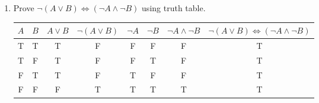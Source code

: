 \documentclass{article}[12pt]
\begin{document}
\begin{enumerate}
\begin{table}[H]
\begin{tabular}{c|c|||c||c||c|c||c|||c}
\end{tabular}
\end{table}
\item Prove $\neg (A\vee B) \Longleftrightarrow (\neg A \wedge \neg B)$ using truth table.
\begin{table}[H]
\centering
\begin{tabular}{c|c|||c||c||c|c||c|||c}
$A$ & $B$ & $A\vee B$ & $\neg (A\vee B)$ & $\neg A $& $\neg B $&$\neg A \wedge \neg B $&$ \neg (A\vee B) \Longleftrightarrow (\neg A \wedge \neg B) $\\ \hline
T & T & T                        & F                                              & F                     & F                     & F                                                               & T                                                                                                                                               \\
T & F & T                        & F                                              & F                     & T                     & F                                                               & T                                                                                                                                               \\
F & T & T                        & F                                              & T                     & F                     & F                                                               & T                                                                                                                                               \\
F & F & F                        & T                                              & T                     & T                     & T                                                               & T                                                                                                                                              

\end{tabular}
\end{table}
\end{enumerate}
\end{document}
